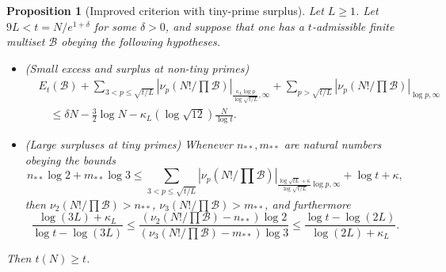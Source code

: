 \documentclass[12pt,a4paper,reqno]{amsart}
\numberwithin{equation}{section}
\theoremstyle{plain}
\newtheorem{proposition}[theorem]{Proposition}
\theoremstyle{definition}
\newcommand\tuple{{\mathcal B}}
\begin{document}
\begin{proposition}[Improved criterion with tiny-prime surplus]\label{balance-23'}  Let $L \geq 1$.
  Let $9L < t = N/e^{1+\delta}$ for some $\delta>0$, and suppose that one has a $t$-admissible finite multiset $\tuple$ obeying the following hypotheses.
\begin{itemize}
\item[(i)] (Small excess and surplus at non-tiny primes)
\begin{equation}\label{new-balance-4}
  \begin{split}
&      E_t(\tuple) + \sum_{3 < p \leq \sqrt{t/L}}
 |\nu_p(N!/\prod \tuple)|_{\frac{\kappa_L \log p}{\log \sqrt{t/L}},\infty} + 
 \sum_{p>\sqrt{t/L}} |\nu_p(N!/\prod \tuple)|_{\log p,\infty}\\
&\quad    \leq \delta N - \frac{3}{2} \log N - \kappa_L (\log \sqrt{12}) \frac{N}{\log t}.
  \end{split}
 \end{equation}
 \item[(ii)] (Large surpluses at tiny primes) Whenever $n_{**}, m_{**}$ are natural numbers obeying the  bounds
 $$ n_{**} \log 2 + m_{**} \log 3 \leq 
 \sum_{3 < p \leq \sqrt{t/L}}
 |\nu_p(N!/\prod \tuple)|_{\frac{\log \sqrt{tL} + \kappa}{\log\sqrt{t/L}} \log p,\infty}
 + \log t + \kappa,$$
 then $\nu_2(N!/\prod \tuple) > n_{**}$, $\nu_3(N!/\prod \tuple) > m_{**}$, and furthermore
 $$
 \frac{\log(3L)+\kappa_L}{\log t - \log(3L)} \leq \frac{(\nu_2(N!/\prod \tuple)-n_{**}) \log 2}{(\nu_3(N!/\prod \tuple)-m_{**}) \log 3} \leq \frac{\log t - \log(2L)}{\log(2L)+\kappa_L}.$$
 \end{itemize}
  Then $t(N) \geq t$.
\end{proposition}
\end{document}
